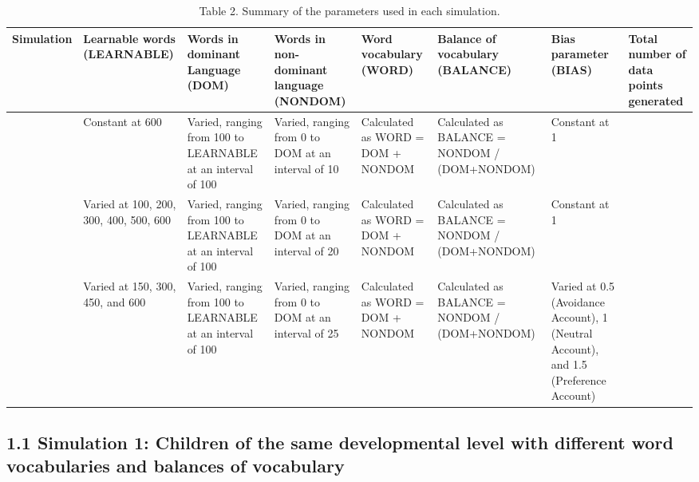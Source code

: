 \documentclass[
  english,
  ,man,floatsintext]{apa6}
\begin{document}
\begin{landscape}\begin{table}

\caption{\label{tab:table2}Table 2. Summary of the parameters used in each simulation.}
\centering
\fontsize{8}{10}\selectfont
\begin{tabular}[t]{>{\centering\arraybackslash}p{45px}>{\raggedright\arraybackslash}p{45px}>{\raggedright\arraybackslash}p{75px}>{\raggedright\arraybackslash}p{75px}>{\raggedright\arraybackslash}p{75px}>{\raggedright\arraybackslash}p{75px}>{\raggedright\arraybackslash}p{75px}>{\raggedright\arraybackslash}p{45px}}
\toprule
Simulation & Learnable words (LEARNABLE) & Words in dominant Language (DOM) & Words in non-dominant language (NONDOM) & Word vocabulary (WORD) & Balance of vocabulary (BALANCE) & Bias parameter (BIAS) & Total number of data points generated\\
\midrule
1 & Constant at 600 & Varied, ranging from 100 to LEARNABLE at an interval of 100 & Varied, ranging from 0 to DOM at an interval of 10 & Calculated as WORD = DOM + NONDOM & Calculated as BALANCE = NONDOM / (DOM+NONDOM) & Constant at 1 & 216\\
2 & Varied at 100, 200, 300, 400, 500, 600 & Varied, ranging from 100 to LEARNABLE at an interval of 100 & Varied, ranging from 0 to DOM at an interval of 20 & Calculated as WORD = DOM + NONDOM & Calculated as BALANCE = NONDOM / (DOM+NONDOM) & Constant at 1 & 301\\
3 & Varied at 150, 300, 450, and 600 & Varied, ranging from 100 to LEARNABLE at an interval of 100 & Varied, ranging from 0 to DOM at an interval of 25 & Calculated as WORD = DOM + NONDOM & Calculated as BALANCE = NONDOM / (DOM+NONDOM) & Varied at 0.5 (Avoidance Account), 1 (Neutral Account), and 1.5 (Preference Account) & 166\\
\bottomrule
\end{tabular}
\end{table}
\end{landscape}

\hypertarget{simulation-1-children-of-the-same-developmental-level-with-different-word-vocabularies-and-balances-of-vocabulary}{%
\subsection{1.1 Simulation 1: Children of the same developmental level with different word vocabularies and balances of vocabulary}\label{simulation-1-children-of-the-same-developmental-level-with-different-word-vocabularies-and-balances-of-vocabulary}}
\end{document}
